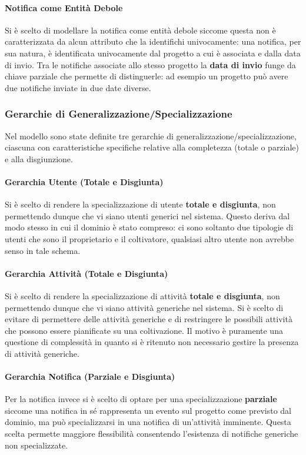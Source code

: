 \documentclass[12pt,a4paper]{article}
\begin{document}
\paragraph{Notifica come Entità Debole}
Si è scelto di modellare la notifica come entità debole siccome questa non è caratterizzata da alcun attributo che la identifichi univocamente: una notifica, per sua natura, è identificata univocamente dal progetto a cui è associata e dalla data di invio. Tra le notifiche associate allo stesso progetto la \textbf{data di invio} funge da chiave parziale che permette di distinguerle: ad esempio un progetto può avere due notifiche inviate in due date diverse.

\subsubsection{Gerarchie di Generalizzazione/Specializzazione}

Nel modello sono state definite tre gerarchie di generalizzazione/specializzazione, ciascuna con caratteristiche specifiche relative alla completezza (totale o parziale) e alla disgiunzione.

\paragraph{Gerarchia Utente (Totale e Disgiunta)}
Si è scelto di rendere la specializzazione di utente \textbf{totale e disgiunta}, non permettendo dunque che vi siano utenti generici nel sistema. Questo deriva dal modo stesso in cui il dominio è stato compreso: ci sono soltanto due tipologie di utenti che sono il proprietario e il coltivatore, qualsiasi altro utente non avrebbe senso in tale schema.

\paragraph{Gerarchia Attività (Totale e Disgiunta)}
Si è scelto di rendere la specializzazione di attività \textbf{totale e disgiunta}, non permettendo dunque che vi siano attività generiche nel sistema. Si è scelto di evitare di permettere delle attività generiche e di restringere le possibili attività che possono essere pianificate su una coltivazione. Il motivo è puramente una questione di complessità in quanto si è ritenuto non necessario gestire la presenza di attività generiche.

\paragraph{Gerarchia Notifica (Parziale e Disgiunta)}
Per la notifica invece si è scelto di optare per una specializzazione \textbf{parziale} siccome una notifica in sé rappresenta un evento sul progetto come previsto dal dominio, ma può specializzarsi in una notifica di un'attività imminente. Questa scelta permette maggiore flessibilità consentendo l'esistenza di notifiche generiche non specializzate.
\end{document}
